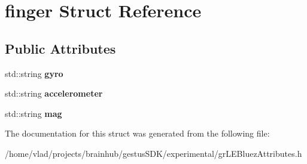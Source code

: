 \hypertarget{structfinger}{}\section{finger Struct Reference}
\label{structfinger}
\subsection*{Public Attributes}
\begin{DoxyCompactItemize}
\item 
\mbox{\label{structfinger_ae76d8541ff4d95b40806d4e12ae1e25d}} 
std\+::string {\bfseries gyro}
\item 
\mbox{\label{structfinger_a35e626569c38aeb7b37fae94cf4c210a}} 
std\+::string {\bfseries accelerometer}
\item 
\mbox{\label{structfinger_a65194f954de07e809a5048c7d2412fd7}} 
std\+::string {\bfseries mag}
\end{DoxyCompactItemize}


The documentation for this struct was generated from the following file\+:\begin{DoxyCompactItemize}
\item 
/home/vlad/projects/brainhub/gestus\+S\+D\+K/experimental/gr\+L\+E\+Bluez\+Attributes.\+h\end{DoxyCompactItemize}
